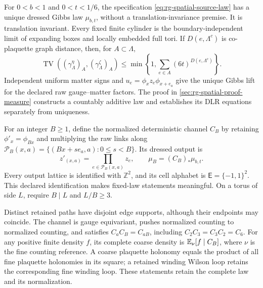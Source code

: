 For \(0<b<1\) and \(0<t<1/6\), the specification
\cref{eq:rg-spatial-source-law} has a unique dressed Gibbs law
\(\mu_{b,t}\), without a translation-invariance premise. It is translation
invariant. Every fixed finite cylinder is the boundary-independent limit of
expanding boxes and locally embedded full tori. If \(D(e,\Lambda^c)\) is
co-plaquette graph distance, then, for \(A\subset\Lambda\),
\begin{equation}
 \operatorname{TV}((\gamma_\Lambda^\eta)_A,(\gamma_\Lambda^\zeta)_A)
 \le\min\left\{1,\sum_{e\in A}(6t)^{D(e,\Lambda^c)}\right\}.
 \label{eq:rg-spatial-boundary-comparison}
\end{equation}
Independent uniform matter signs and
\(u_e=\phi_xz_e\phi_{x+e_a}\) give the unique Gibbs lift for the declared
raw gauge--matter factors. The proof in
\cref{sec:rg-spatial-proof-measure} constructs a countably additive law and
establishes its DLR equations separately from uniqueness. 

For an integer \(B\ge1\), define the normalized deterministic channel \(C_B\)
by retaining \(\phi'_x=\phi_{Bx}\) and multiplying the raw links along
\(\mathcal P_B(x,a)=\{(Bx+se_a,a):0\le s<B\}\). Its dressed output is
\begin{equation}
 z'_{(x,a)}=\prod_{e\in\mathcal P_B(x,a)}z_e,
 \qquad \mu_B=(C_B)_*\mu_{b,t}.
 \label{eq:rg-spatial-path-channel}
\end{equation}
Every output lattice is identified with \(\mathbb Z^2\), and its cell alphabet
is \(\mathsf E=\{-1,1\}^2\). This declared identification makes fixed-law
statements meaningful. On a torus of side \(L\), require \(B\mid L\) and
\(L/B\ge3\). 

Distinct retained paths have disjoint edge supports, although their endpoints
may coincide. The channel is gauge equivariant, pushes normalized counting to
normalized counting, and satisfies \(C_aC_B=C_{aB}\), including
\(C_2C_3=C_3C_2=C_6\). For any positive finite density \(f\), its complete
coarse density is \(\mathbb E_{\nu}[f\mid C_B]\), where \(\nu\) is the fine counting
reference. A coarse plaquette holonomy equals the product of all fine
plaquette holonomies in its square; a retained winding Wilson loop retains
the corresponding fine winding loop. These statements retain the complete
law and its normalization. 

